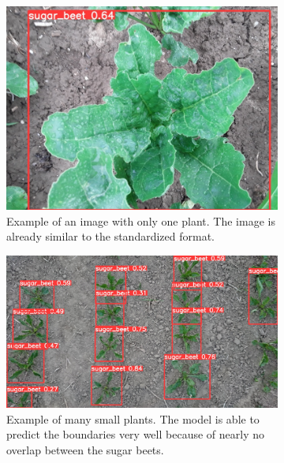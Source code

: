 \begin{figure}[htb!]
	\begin{subfigure}{.4\textwidth}
		\centering
		\includegraphics[scale=0.19]{figures/result_1.jpg}
		\caption{Example of an image with only one plant. The image is already similar to the standardized format.}
		\label{fig:result_1}
	\end{subfigure}%
	\begin{subfigure}{.6\textwidth}
		\centering
		\includegraphics[scale=0.15]{figures/result_2.JPG}
		\caption{Example of many small plants. The model is able to predict the boundaries very well because of nearly no overlap between the sugar beets.}
		\label{fig:result_2}
	\end{subfigure}
	\begin{subfigure}{.4\textwidth}
		\centering

\end{subfigure}
\end{figure}
